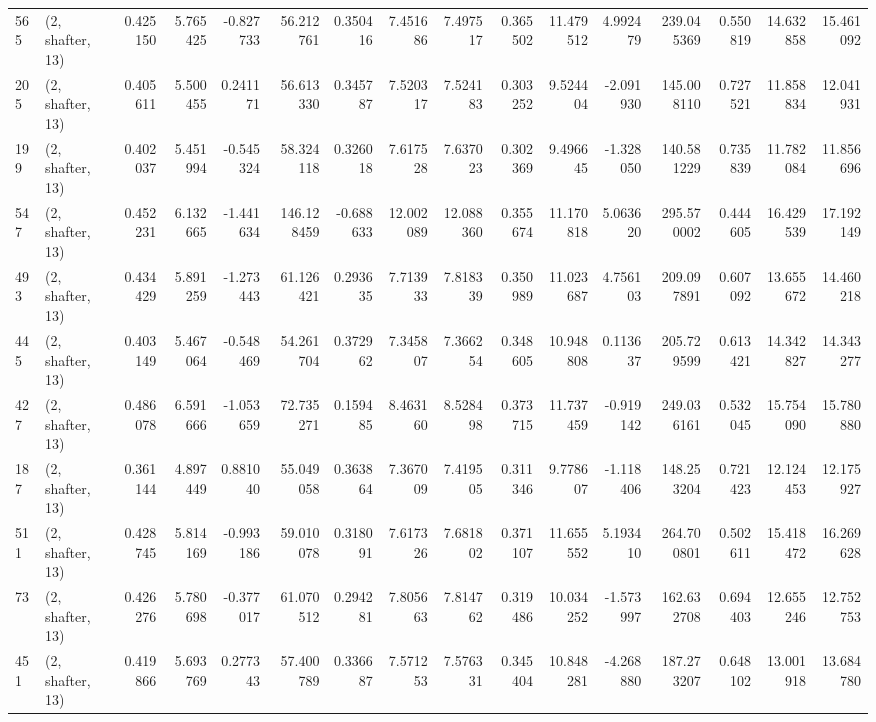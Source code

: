 \begin{tabular}{llrrrrrrrrrrrrrr}
565 &  (2, shafter, 13) &   0.425150 &   5.765425 &  -0.827733 &    56.212761 &   0.350416 &   7.451686 &   7.497517 &  0.365502 &  11.479512 &   4.992479 &    239.045369 &   0.550819 &   14.632858 &   15.461092 \\
205 &  (2, shafter, 13) &   0.405611 &   5.500455 &   0.241171 &    56.613330 &   0.345787 &   7.520317 &   7.524183 &  0.303252 &   9.524404 &  -2.091930 &    145.008110 &   0.727521 &   11.858834 &   12.041931 \\
199 &  (2, shafter, 13) &   0.402037 &   5.451994 &  -0.545324 &    58.324118 &   0.326018 &   7.617528 &   7.637023 &  0.302369 &   9.496645 &  -1.328050 &    140.581229 &   0.735839 &   11.782084 &   11.856696 \\
547 &  (2, shafter, 13) &   0.452231 &   6.132665 &  -1.441634 &   146.128459 &  -0.688633 &  12.002089 &  12.088360 &  0.355674 &  11.170818 &   5.063620 &    295.570002 &   0.444605 &   16.429539 &   17.192149 \\
493 &  (2, shafter, 13) &   0.434429 &   5.891259 &  -1.273443 &    61.126421 &   0.293635 &   7.713933 &   7.818339 &  0.350989 &  11.023687 &   4.756103 &    209.097891 &   0.607092 &   13.655672 &   14.460218 \\
445 &  (2, shafter, 13) &   0.403149 &   5.467064 &  -0.548469 &    54.261704 &   0.372962 &   7.345807 &   7.366254 &  0.348605 &  10.948808 &   0.113637 &    205.729599 &   0.613421 &   14.342827 &   14.343277 \\
427 &  (2, shafter, 13) &   0.486078 &   6.591666 &  -1.053659 &    72.735271 &   0.159485 &   8.463160 &   8.528498 &  0.373715 &  11.737459 &  -0.919142 &    249.036161 &   0.532045 &   15.754090 &   15.780880 \\
187 &  (2, shafter, 13) &   0.361144 &   4.897449 &   0.881040 &    55.049058 &   0.363864 &   7.367009 &   7.419505 &  0.311346 &   9.778607 &  -1.118406 &    148.253204 &   0.721423 &   12.124453 &   12.175927 \\
511 &  (2, shafter, 13) &   0.428745 &   5.814169 &  -0.993186 &    59.010078 &   0.318091 &   7.617326 &   7.681802 &  0.371107 &  11.655552 &   5.193410 &    264.700801 &   0.502611 &   15.418472 &   16.269628 \\
73  &  (2, shafter, 13) &   0.426276 &   5.780698 &  -0.377017 &    61.070512 &   0.294281 &   7.805663 &   7.814762 &  0.319486 &  10.034252 &  -1.573997 &    162.632708 &   0.694403 &   12.655246 &   12.752753 \\
451 &  (2, shafter, 13) &   0.419866 &   5.693769 &   0.277343 &    57.400789 &   0.336687 &   7.571253 &   7.576331 &  0.345404 &  10.848281 &  -4.268880 &    187.273207 &   0.648102 &   13.001918 &   13.684780 \\

\end{tabular}

